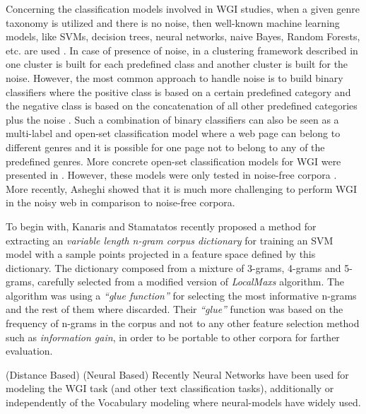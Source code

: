 Concerning the classification models involved in WGI studies, when a given genre taxonomy is utilized and there is no noise, then well-known machine learning models, like SVMs, decision trees, neural networks, naive Bayes, Random Forests, etc. are used \parencite{Lim2005,santini2007automatic,kanaris2009learning,jebari2015combination,sharoff2010web}. In case of presence of  noise, in a clustering framework described in \parencite{kennedy2005automatic} one cluster is built for each predefined class and another cluster is built for the noise. However, the most  common approach to handle noise is to build binary classifiers where the positive class is based on a certain predefined category and the negative class is based on the concatenation of  all other predefined categories plus the noise \parencite{kennedy2005automatic,dong2006binary,levering2008using}. Such a combination of binary classifiers can also be seen as a multi-label  and open-set classification model where a web page can belong to different genres and it is possible for one page not to belong to any of the predefined genres. More concrete open-set  classification models for WGI were presented in \parencite{stubbe2007genre,pritsos2013open}. However, these models were only tested in noise-free corpora \parencite{pritsos2015clef}. More  recently, Asheghi \parencite{Asheghi2015} showed that it is much more challenging to perform WGI in the noisy web in comparison to noise-free corpora.

To begin with, Kanaris and Stamatatos \parencite{kanaris2009learning} recently proposed a method for extracting an \textit{variable length n-gram corpus dictionary} for training an SVM model with a sample points projected in a feature space defined by this dictionary. The dictionary composed from a mixture of 3-grams, 4-grams and 5-grams, carefully selected from a modified version of \textit{LocalMaxs }algorithm. The algorithm was using a \textit{``glue function''} for selecting the most informative n-grams and the rest of them where discarded. Their \textit{``glue''} function was based on the frequency of n-grams in the corpus and not to any other feature selection method such as \textit{information gain}, in order to be portable to other corpora for farther evaluation.  

(Distance Based)
(Neural Based)
Recently Neural Networks have been used for modeling the WGI task (and other text classification tasks), additionally or independently of the Vocabulary modeling where neural-models have widely used. 

